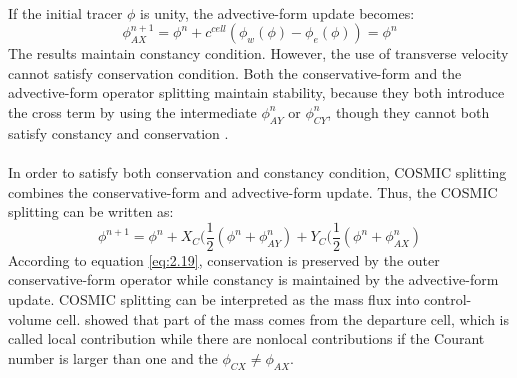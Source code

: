 \paragraph{}
If the initial tracer $\phi $ is unity, the advective-form update becomes:
\begin{equation} \label{eq:2.18}
\phi^{n+1}_{\scriptscriptstyle AX} = \phi^{n}+c^{cell}(\phi_w(\phi )-\phi_e(\phi )) = \phi^{n}
\end{equation}
The results maintain constancy condition. However, the use of transverse velocity cannot satisfy conservation condition. Both the conservative-form and the advective-form operator splitting  maintain stability, because they both introduce the cross term by using the intermediate $\phi^{n}_{\scriptscriptstyle AY}$ or $\phi^{n}_{\scriptscriptstyle CY}$, though they cannot both satisfy constancy and conservation \citep{Leonard1996}.
\paragraph{}
In order to satisfy both conservation and constancy condition, COSMIC splitting \citep{Leonard1996} combines the conservative-form and advective-form update. Thus, the COSMIC splitting can be written as:
\begin{equation} \label{eq:2.19}
\phi^{n+1} = \phi^n+X_{\scriptscriptstyle C}(\frac{1}{2}(\phi^n + \phi^n _{\scriptscriptstyle AY}) +Y_{\scriptscriptstyle C}(\frac{1}{2}(\phi^n + \phi^n _{\scriptscriptstyle AX})
\end{equation}
According to equation \ref{eq:2.19}, conservation is preserved by the outer conservative-form operator while constancy is maintained by the advective-form update. COSMIC splitting can be interpreted as the mass flux into control-volume cell. \cite{Lauritzen2007} showed that part of the mass comes from the departure cell, which is called local contribution  while there are nonlocal contributions if the Courant number is larger than one and the $\phi_{CX} \neq \phi_{AX}$.